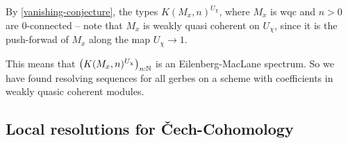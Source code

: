 By \cref{vanishing-conjecture},
the types $K(M_x,n)^{U_\chi}$, where $M_x$ is wqc and $n>0$ are $0$-connected
-- note that $M_x$ is weakly quasi coherent on $U_\chi$, since it is the push-forwad
of $M_x$ along the map $U_\chi\to 1$.

This means that $\left(K(M_x,n)^{U_\chi}\right)_{n:\mathbb{N}}$ is an Eilenberg-MacLane spectrum.
So we have found resolving sequences for all gerbes on a scheme with coefficients in weakly quasic coherent modules.


\subsection{Local resolutions for \v{C}ech-Cohomology}